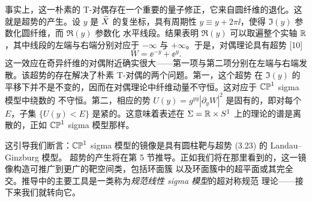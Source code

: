 事实上，这一朴素的 T-对偶存在一个重要的量子修正，它来自圆纤维的退化。这就是超势的产生。设 $y$ 是
$\widetilde{X}$ 的复坐标，具有周期性 $y\equiv y+2\pi\ii$，使得 $\Im(y)$ 参数化圆纤维，而 $\Re(y)$ 参数化
水平线段。结果表明 $\Re(y)$ 可以取遍整个实轴 $\mathbb{R}$，其中线段的左端与右端分别对应于 $-\infty$ 与
$+\infty$。于是，对偶理论具有超势 [10]
\begin{equation}
  W=\ee^{-y}+\ee^{y}. \tag{3.23}
\end{equation}
这一效应在奇异纤维的对偶附近确实很大——第一项与第二项分别在左端与右端发散。该超势的存在解决了朴素
T-对偶的两个问题。第一，这个超势
在 $\Im(y)$ 的平移下并不是不变的，因而在对偶理论中纤维动量不守恒。这对应于 $\mathbb{CP}^1$ sigma 模型中绕数的
不守恒。第二，相应的势 $U(y)=g^{y\overline{y}}|\partial_yW|^2$ 是固有的，即对每个 $E$，子集
$\{U(y)<E\}$ 是紧的。这意味着表述在 $\Sigma=\mathbb{R}\times S^1$ 上的理论的谱是离散的，正如 $\mathbb{CP}^1$
sigma 模型那样。

这引导我们断言：$\mathbb{CP}^1$ sigma 模型的镜像是具有圆柱靶与超势 (3.23) 的 Landau–Ginzburg 模型。
超势的产生将在第 5 节推导。正如我们将在那里看到的，这一镜像构造可推广到更广的靶空间类，包括环面簇
以及环面簇中的超平面或其完全交。推导中的主要工具是一类称为\emph{规范线性 sigma 模型}的超对称规范
理论——接下来我们就转向它。

